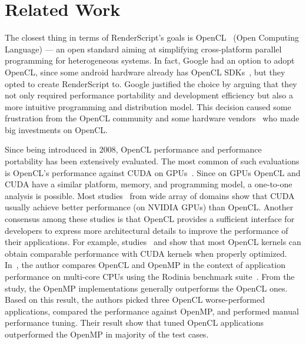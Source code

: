 \section{Related Work}
The closest thing in terms of RenderScript's goals is OpenCL~\cite{OpenCL} (Open
Computing Language) --- an open standard aiming at simplifying cross-platform
parallel programming for heterogeneous systems.  In fact, Google had an option
to adopt OpenCL, since some android hardware already has OpenCL
SDKs~\cite{OpenCL:Android}, but they opted to create RenderScript to.  Google
justified the choice by arguing that they not only required performance
portability and development efficiency but also a more intuitive programming and
distribution model.  This decision caused some frustration from the OpenCL
community \cite{androidblockopenCL} and some hardware
vendors~\cite{googlelockin} who made big investments on OpenCL.

Since being introduced in 2008, OpenCL performance and performance portability
has been extensively evaluated.  The most common of such evaluations is OpenCL's
performance against CUDA on GPUs~\cite{fang2011comprehensive,
weber2011comparing, van2011correlating, vassilev2010comparison,
amorim2009comparing, karimi2010performance, komatsu2010evaluating}.  Since on
GPUs OpenCL and CUDA have a similar platform, memory, and programming model, a
one-to-one analysis is possible.  Most studies~\cite{weber2011comparing,
van2011correlating, vassilev2010comparison, amorim2009comparing}  from wide
array of domains show that CUDA usually achieve better performance (on NVIDIA
GPUs) than OpenCL.  Another consensus among these studies is that OpenCL
provides a sufficient interface for developers to express more architectural
details to improve the performance of their applications.  For example,
studies~\cite{komatsu2010evaluating} and \cite{fang2011comprehensive} show that
most OpenCL kernels can obtain comparable performance with CUDA kernels when
properly optimized.  In~\cite{shen2012performance}, the author compares OpenCL
and OpenMP in the context of application performance on multi-core CPUs using
the Rodinia benchmark suite~\cite{che2009rodinia}.  From the study, the OpenMP
implementations generally outperforms the OpenCL ones.  Based on this result,
the authors picked three OpenCL worse-performed applications, compared the
performance against OpenMP, and performed manual performance tuning.  Their
result show that tuned OpenCL applications outperformed the OpenMP in majority
of the test cases.

